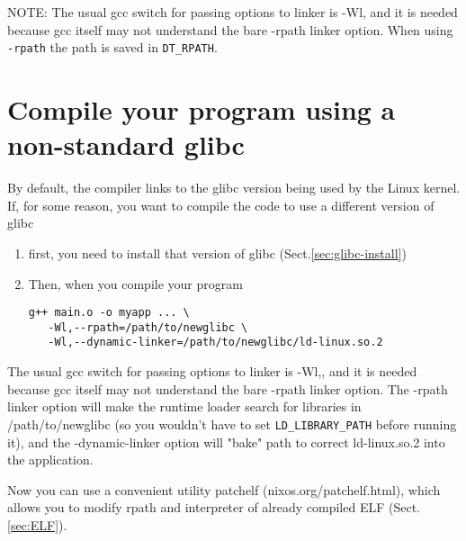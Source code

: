 NOTE: The usual gcc switch for passing options to linker is -Wl, and it is
needed because gcc itself may not understand the bare -rpath linker option. 
When using \verb!-rpath! the path is saved in \verb!DT_RPATH!.



\section{Compile your program using a non-standard glibc}

By default, the compiler links to the glibc version being used by the Linux
kernel. If, for some reason, you want to compile the code to use a different
version of glibc
\begin{enumerate}
  \item first, you need to install that version of glibc (Sect.\ref{sec:glibc-install})
  
  \item 
 Then, when you compile your program
\begin{verbatim}
g++ main.o -o myapp ... \
   -Wl,--rpath=/path/to/newglibc \
   -Wl,--dynamic-linker=/path/to/newglibc/ld-linux.so.2
\end{verbatim}

\end{enumerate}

The usual gcc switch for passing options to linker is -Wl,, and it is needed
because gcc itself may not understand the bare -rpath linker option.
The -rpath linker option will make the runtime loader search for libraries in
/path/to/newglibc (so you wouldn't have to set \verb!LD_LIBRARY_PATH! before
running it), and the -dynamic-linker option will "bake" path to correct
ld-linux.so.2 into the application.


	
Now you can use a convenient utility patchelf (nixos.org/patchelf.html), which
allows you to modify rpath and interpreter of already compiled ELF
(Sect.\ref{sec:ELF}).
